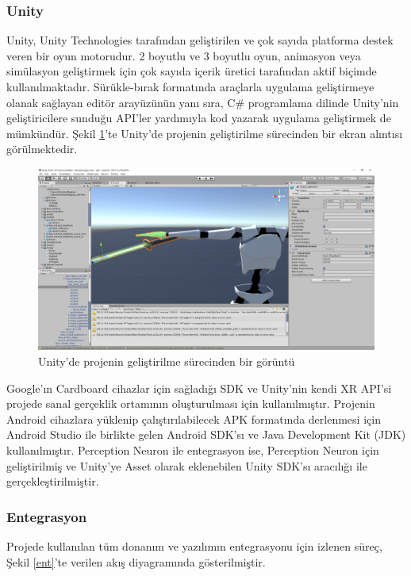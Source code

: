 \documentclass[a4paper, 12pt, titlepage]{article}
\begin{document}
\subsubsection{Unity}
Unity, Unity Technologies tarafından geliştirilen ve çok sayıda platforma destek veren bir oyun
motorudur. 2 boyutlu ve 3 boyutlu oyun, animasyon veya simülasyon geliştirmek için çok sayıda
içerik üretici tarafından aktif biçimde kullanılmaktadır. Sürükle-bırak formatında araçlarla
uygulama geliştirmeye olanak sağlayan editör arayüzünün yanı sıra, C\# programlama dilinde
Unity’nin geliştiricilere sunduğu API’ler yardımıyla kod yazarak uygulama geliştirmek de mümkündür.
\cite{unityg} Şekil \ref{u}'te Unity’de projenin geliştirilme sürecinden bir ekran alıntısı
görülmektedir.

\begin{figure}[hbt!]
    \centering
        \includegraphics[width=6in]{images/u}
    \caption{Unity'de projenin geliştirilme sürecinden bir görüntü}   
    \label{u}
\end{figure}

Google’ın Cardboard cihazlar için sağladığı SDK ve Unity’nin kendi XR API’si projede sanal
gerçeklik ortamının oluşturulması için kullanılmıştır. Projenin Android cihazlara yüklenip
çalıştırılabilecek APK formatında derlenmesi için Android Studio ile birlikte gelen Android SDK’sı
ve Java Development Kit (JDK) kullanılmıştır. Perception Neuron ile entegrasyon ise, Perception
Neuron için geliştirilmiş ve Unity’ye Asset olarak eklenebilen Unity SDK’sı aracılığı ile
gerçekleştirilmiştir.

\subsubsection{Entegrasyon}
Projede kullanılan tüm donanım ve yazılımın entegrasyonu için izlenen süreç, Şekil \ref{ent}’te
verilen akış diyagramında gösterilmiştir.
\end{document}

